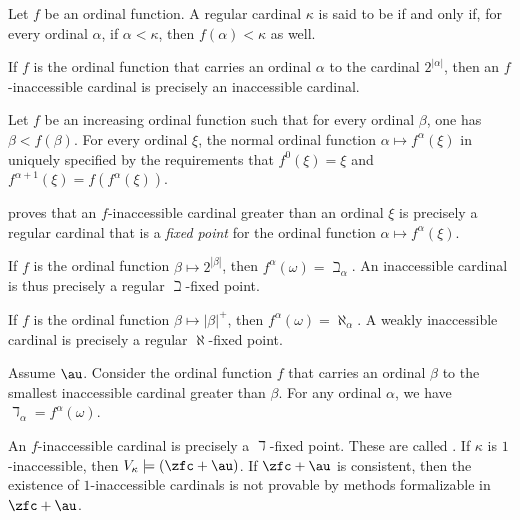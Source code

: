 \begin{definition}
	Let $ f $ be an ordinal function.
	A regular cardinal $ \kappa $ is said to be
	 if and only if,
	for every ordinal $ \alpha$, if $ \alpha < \kappa $,
	then $ f(\alpha) < \kappa $ as well.
\end{definition}

\begin{eg}
	If $ f $ is the ordinal function that carries
	an ordinal $ \alpha $ to the cardinal $ 2^{|\alpha|} $,
	then an $ f $-inaccessible cardinal is precisely
	an inaccessible cardinal.
\end{eg}

\begin{construction}
	Let $ f $ be an increasing ordinal function
	such that for every ordinal $ \beta $, one has $ \beta < f(\beta) $.
	For every ordinal $ \xi $,
	the normal ordinal function $ \alpha \mapsto f^{\alpha}(\xi) $
	in uniquely specified by the requirements that
	$ f^0(\xi) = \xi $ and $ f^{\alpha + 1}(\xi) =f(f^{\alpha}(\xi)) $.

	\cite{Jorgensen1970} proves that an $ f $-inaccessible cardinal
	greater than an ordinal $ \xi $
	is precisely a regular cardinal that is a \emph{fixed point}
	for the ordinal function $ \alpha \mapsto f^{\alpha}(\xi) $.
\end{construction}

\begin{eg}
	If $ f $ is the ordinal function $ \beta \mapsto 2^{|\beta|} $,
	then $ f^{\alpha}(\omega) = \beth_{\alpha} $.
	An inaccessible cardinal is thus precisely a regular $ \beth $-fixed point.
	
	If $ f $ is the ordinal function $ \beta \mapsto |\beta|^+ $,
	then $ f^{\alpha}(\omega) = \aleph_{\alpha} $. 
	A weakly inaccessible cardinal is precisely a regular $ \aleph $-fixed  point.
\end{eg}

\begin{eg}
	Assume $ \au $.
	Consider the ordinal function $ f $ that carries
	an ordinal $ \beta $ to the smallest inaccessible cardinal greater than $ \beta $.
	For any ordinal $ \alpha $,
	we have $ \daleth_{\alpha} = f^{\alpha}(\omega) $.

	An $ f $-inaccessible cardinal is precisely a $ \daleth $-fixed point.
	These are called .
	If $ \kappa $ is $ 1 $-inaccessible, then
	$ V_{\kappa} \models (\zfc + \au) $.
	If $ \zfc + \au $ is consistent, then
	the existence of $ 1 $-inaccessible cardinals is not provable
	by methods formalizable in $ \zfc + \au $.
\end{eg}

